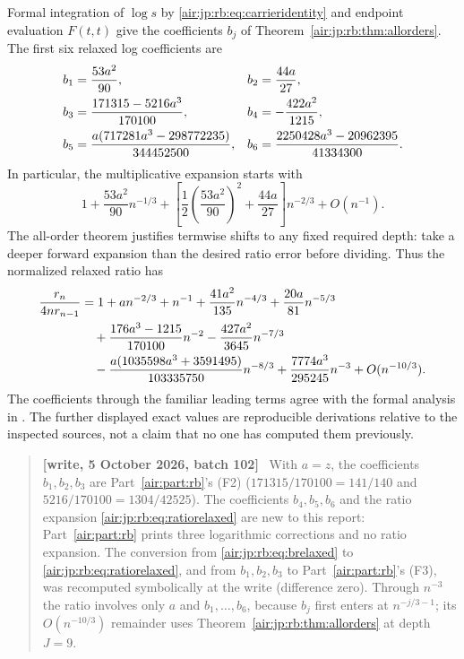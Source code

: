 \documentclass[11pt,letterpaper]{article}
\numberwithin{equation}{section}
\theoremstyle{remark}
\newenvironment{writenotejp}{\par\smallskip\begin{quote}\small\textbf{[write, 5 October 2026, batch 102]}\ }{\end{quote}\smallskip}
\begin{document}
Formal integration of $\log s$ by \eqref{air:jp:rb:eq:carrieridentity} and endpoint evaluation $F(t,t)$ give the coefficients $b_j$ of Theorem~\ref{air:jp:rb:thm:allorders}. The first six relaxed log coefficients are
\begin{align}
 b_1&=\frac{53a^2}{90},& b_2&=\frac{44a}{27},\notag\\
 b_3&=\frac{171315-5216a^3}{170100},& b_4&=-\frac{422a^2}{1215},\notag\\
 b_5&=\frac{a(717281a^3-298772235)}{344452500},&
 b_6&=\frac{2250428a^3-20962395}{41334300}.\label{air:jp:rb:eq:brelaxed}
\end{align}
In particular, the multiplicative expansion starts with
\[
 1+\frac{53a^2}{90}n^{-1/3}
 +\left[\frac12\left(\frac{53a^2}{90}\right)^2+\frac{44a}{27}\right]n^{-2/3}
 +O(n^{-1}).
\]
The all-order theorem justifies termwise shifts to any fixed required depth: take a deeper forward expansion than the desired ratio error before dividing. Thus the normalized relaxed ratio has
\begin{align}
 \frac{r_n}{4nr_{n-1}}
 &=1+an^{-2/3}+n^{-1}+\frac{41a^2}{135}n^{-4/3}
       +\frac{20a}{81}n^{-5/3}\notag\\
 &\quad+\frac{176a^3-1215}{170100}n^{-2}
       -\frac{427a^2}{3645}n^{-7/3}\notag\\
 &\quad-\frac{a(1035598a^3+3591495)}{103335750}n^{-8/3}
       +\frac{7774a^3}{295245}n^{-3}
       +O(n^{-10/3}).\label{air:jp:rb:eq:ratiorelaxed}
\end{align}
The coefficients through the familiar leading terms agree with the formal analysis in \cite[Section 3.4]{epfw}. The further displayed exact values are reproducible derivations relative to the inspected sources, not a claim that no one has computed them previously.
\begin{writenotejp}
With $a=z$, the coefficients $b_1,b_2,b_3$ are Part~\ref{air:part:rb}'s (F2) ($171315/170100=141/140$ and $5216/170100=1304/42525$). The coefficients $b_4,b_5,b_6$ and the ratio expansion \eqref{air:jp:rb:eq:ratiorelaxed} are new to this report: Part~\ref{air:part:rb} prints three logarithmic corrections and no ratio expansion. The conversion from \eqref{air:jp:rb:eq:brelaxed} to \eqref{air:jp:rb:eq:ratiorelaxed}, and from $b_1,b_2,b_3$ to Part~\ref{air:part:rb}'s (F3), was recomputed symbolically at the write (difference zero). Through $n^{-3}$ the ratio involves only $a$ and $b_1,\ldots,b_6$, because $b_j$ first enters at $n^{-j/3-1}$; its $O(n^{-10/3})$ remainder uses Theorem~\ref{air:jp:rb:thm:allorders} at depth $J=9$.
\end{writenotejp}
\end{document}
